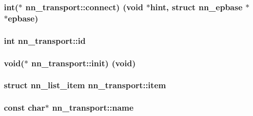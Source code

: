 \subsubsection[{connect}]{\setlength{\rightskip}{0pt plus 5cm}int($\ast$ nn\+\_\+transport\+::connect) (void $\ast$hint, struct {\bf nn\+\_\+epbase} $\ast$$\ast$epbase)}\hypertarget{structnn__transport_a8b9815786bf58364e89921bec636a1f9}{}\label{structnn__transport_a8b9815786bf58364e89921bec636a1f9}
\subsubsection[{id}]{\setlength{\rightskip}{0pt plus 5cm}int nn\+\_\+transport\+::id}\hypertarget{structnn__transport_afa0ae53caa7dc89cb290f7a36ea2bcf1}{}\label{structnn__transport_afa0ae53caa7dc89cb290f7a36ea2bcf1}
\subsubsection[{init}]{\setlength{\rightskip}{0pt plus 5cm}void($\ast$ nn\+\_\+transport\+::init) (void)}\hypertarget{structnn__transport_ae93a54f87dd8d25c83364a6daec3cb8c}{}\label{structnn__transport_ae93a54f87dd8d25c83364a6daec3cb8c}
\subsubsection[{item}]{\setlength{\rightskip}{0pt plus 5cm}struct {\bf nn\+\_\+list\+\_\+item} nn\+\_\+transport\+::item}\hypertarget{structnn__transport_ac8ae899e71a699a7bb1bb506aa404437}{}\label{structnn__transport_ac8ae899e71a699a7bb1bb506aa404437}
\subsubsection[{name}]{\setlength{\rightskip}{0pt plus 5cm}const char$\ast$ nn\+\_\+transport\+::name}\hypertarget{structnn__transport_a41c2bd6de70330d2dc35887143428de7}{}\label{structnn__transport_a41c2bd6de70330d2dc35887143428de7}
